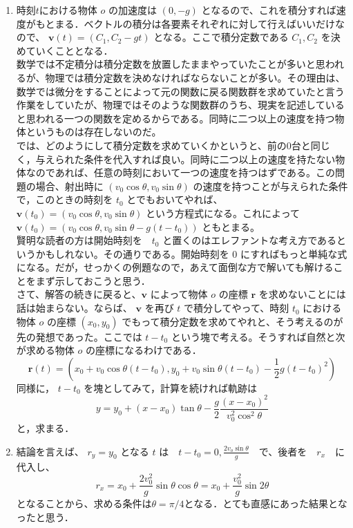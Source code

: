 \documentclass[
  b4paperpaper,
  xelatex,ja=standard]{bxjsbook}
\begin{document}

\begin{enumerate}
\def\labelenumi{\arabic{enumi}.}
\item
  時刻\(t\)における物体 \(o\) の加速度は \((0,-g)\)
  となるので、これを積分すれば速度がもとまる．ベクトルの積分は各要素それぞれに対して行えばいいだけなので、
  \(\boldsymbol{v}(t)=(C_1,C_2-gt)\) となる。ここで積分定数である
  \(C_1,C_2\) を決めていくこととなる．\[ \]
  数学では不定積分は積分定数を放置したままやっていたことが多いと思われるが、物理では積分定数を決めなければならないことが多い。その理由は、数学では微分をすることによって元の関数に戻る関数群を求めていたと言う作業をしていたが、物理ではそのような関数群のうち、現実を記述していると思われる一つの関数を定めるからである。同時に二つ以上の速度を持つ物体というものは存在しないのだ。\[ \]
  では、どのようにして積分定数を求めていくかというと、前の0台と同じく，与えられた条件を代入すれば良い。同時に二つ以上の速度を持たない物体なのであれば、任意の時刻において一つの速度を持つはずである。この問題の場合、射出時に
  \((v_0\cos \theta, v_0 \sin \theta)\)
  の速度を持つことが与えられた条件で，このときの時刻を \(t_0\)
  とでもおいてやれば、
  \(\boldsymbol{v}(t_0)=(v_0\cos \theta, v_0 \sin \theta)\)
  という方程式になる。これによって
  \(\boldsymbol{v}(t_0)=(v_0\cos \theta, v_0 \sin \theta-g(t-t_0))\)
  ともとまる。\[ \] 賢明な読者の方は開始時刻を　\(t_0\)
  と置くのはエレファントな考え方であるというかもしれない。その通りである。開始時刻を
  \(0\)
  にすればもっと単純な式になる。だが，せっかくの例題なので，あえて面倒な方で解いても解けることをまず示しておこうと思う．\[ \]
  さて、解答の続きに戻ると、\(\boldsymbol{v}\) によって物体 \(o\) の座標
  \(\boldsymbol{r}\) を求めないことには話は始まらない。ならば、
  \(\boldsymbol{v}\) を再び \(t\) で積分してやって、時刻 \(t_0\)
  における物体 \(o\) の座標 \((x_0,y_0)\)
  でもって積分定数を求めてやれと、そう考えるのが先の発想であった。ここでは
  \(t-t_0\) という塊で考える。そうすれば自然と次が求める物体 \(o\)
  の座標になるわけである．
  \[\boldsymbol{r}(t)=(x_0+v_0\cos \theta (t-t_0), y_0+v_0 \sin \theta (t-t_0)-\frac{1}{2}g(t-t_0)^2)\]
  同様に， \(t-t_0\) を塊としてみて，計算を続ければ軌跡は
  \[y=y_0+(x-x_0)\tan\theta-\frac{g}{2}\frac{(x-x_0)^2}{v_0^2\cos^2\theta}\]
  と，求まる．
\item
  結論を言えば、 \(r_y=y_0\) となる \(t\)
  は　\(t-t_0=0,\frac{2v_o\sin\theta}{g}\)　で、後者を　\(r_x\)　に代入し、
  \[r_x=x_0+\frac{2v_0^2}{g}\sin \theta \cos \theta=x_0+\frac{v_0^2}{g}\sin 2\theta\]
  となることから、求める条件は\(\theta = \pi /4\)となる．とても直感にあった結果となったと思う．

\end{enumerate}
\end{document}
